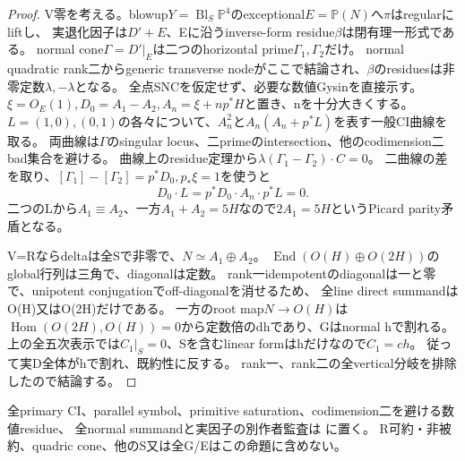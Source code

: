 \documentclass[a4paper,11pt]{ltjsarticle}
\theoremstyle{definition}
\begin{document}
\begin{proof}
V零を考える。blowup$Y=\operatorname{Bl}_S\mathbb P^4$のexceptional$E=\mathbb P(N)$へ$\pi$はregularにliftし、
実退化因子は$D'+E$、Eに沿うinverse-form residue$\beta$は閉有理一形式である。
normal cone$\Gamma=D'|_E$は二つのhorizontal prime$\Gamma_1,\Gamma_2$だけ。
normal quadratic rank二からgeneric transverse nodeがここで結論され、$\beta$のresiduesは非零定数$\lambda,-\lambda$となる。
全点SNCを仮定せず、必要な数値Gysinを直接示す。
$\xi=O_E(1),D_0=A_1-A_2,A_n=\xi+np^*H$と置き、nを十分大きくする。
$L=(1,0),(0,1)$の各々について、$A_n^2$と$A_n(A_n+p^*L)$を表す一般CI曲線を取る。
両曲線は$\Gamma$のsingular locus、二primeのintersection、他のcodimension二bad集合を避ける。
曲線上のresidue定理から$\lambda(\Gamma_1-\Gamma_2)\cdot C=0$。
二曲線の差を取り、$[\Gamma_1]-[\Gamma_2]=p^*D_0,p_*\xi=1$を使うと
\[
 D_0\cdot L=p^*D_0\cdot A_n\cdot p^*L=0.
\]
二つのLから$A_1\equiv A_2$、一方$A_1+A_2=5H$なので$2A_1=5H$というPicard parity矛盾となる。

V=Rならdeltaは全Sで非零で、$N\simeq A_1\oplus A_2$。
$\operatorname{End}(O(H)\oplus O(2H))$のglobal行列は三角で、diagonalは定数。
rank一idempotentのdiagonalは一と零で、unipotent conjugationでoff-diagonalを消せるため、
全line direct summandはO(H)又はO(2H)だけである。
一方のroot map$N\to O(H)$は$\operatorname{Hom}(O(2H),O(H))=0$から定数倍のdhであり、Gはnormal hで割れる。
上の全五次表示では$C_1|_S=0$、Sを含むlinear formはhだけなので$C_1=ch$。
従って実D全体がhで割れ、既約性に反する。
rank一、rank二の全vertical分岐を排除したので結論する。
\end{proof}
全primary CI、parallel symbol、primitive saturation、codimension二を避ける数値residue、
全normal summandと実因子の別作者監査は
に置く。
R可約・非被約、quadric cone、他のS又は全G/Eはこの命題に含めない。
\end{document}
